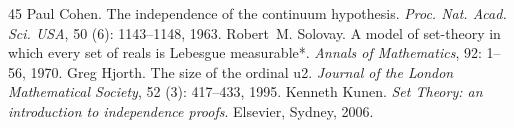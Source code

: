 \documentclass[10pt,a4paper]{amsart}
\numberwithin{equation}{section}
\numberwithin{figure}{section}
\theoremstyle{plain}
\theoremstyle{plain}
\theoremstyle{plain}
\theoremstyle{plain}
\theoremstyle{remark}
\theoremstyle{plain}
\theoremstyle{definition}
\begin{document}
\begin{thebibliography}{45}
 Paul Cohen.
\newblock The independence of the continuum hypothesis.
\newblock \emph{Proc. Nat. Acad. Sci. USA}, 50 (6):
  1143--1148, 1963.
 Robert~M. Solovay.
\newblock A model of set-theory in which every set of reals is {L}ebesgue
  measurable*.
\newblock \emph{Annals of Mathematics}, 92: 1--56, 1970.
 Greg Hjorth.
\newblock The size of the ordinal u2.
\newblock \emph{Journal of the London Mathematical Society}, 52
  (3): 417--433, 1995.
 Kenneth Kunen.
\newblock \emph{Set Theory: an introduction to independence proofs}.
\newblock Elsevier, Sydney, 2006.
\end{thebibliography}
\end{document}
